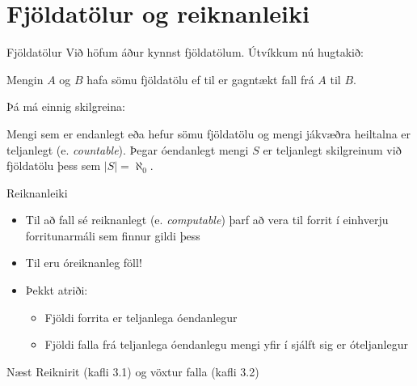 \documentclass[handout]{beamer}
\begin{document}
\section{Fjöldatölur og reiknanleiki}

\begin{frame}{Fjöldatölur}
Við höfum áður kynnst fjöldatölum. Útvíkkum nú hugtakið:

\begin{tcolorbox}[title=Eins fjöldatölur]
Mengin $A$ og $B$ hafa sömu fjöldatölu ef til er gagntækt fall frá $A$ til $B$.
\end{tcolorbox}

Þá má einnig skilgreina:

\begin{tcolorbox}[title=Teljanleiki]
Mengi sem er endanlegt eða hefur sömu fjöldatölu og mengi jákvæðra heiltalna er teljanlegt (e. \emph{countable}). Þegar óendanlegt mengi $S$ er teljanlegt skilgreinum við fjöldatölu þess sem $|S| = \aleph_0$.
\end{tcolorbox}
\end{frame}

\begin{frame}{Reiknanleiki}
\begin{itemize}
 \item Til að fall sé reiknanlegt (e. \emph{computable}) þarf að vera til forrit í einhverju forritunarmáli sem finnur gildi þess
 \item Til eru óreiknanleg föll!
 \item Þekkt atriði:
 \begin{itemize}
  \item Fjöldi forrita er teljanlega óendanlegur
  \item Fjöldi falla frá teljanlega óendanlegu mengi yfir í sjálft sig er óteljanlegur
 \end{itemize}
\end{itemize}
\end{frame}

\begin{frame}{Næst}
Reiknirit (kafli 3.1) og vöxtur falla (kafli 3.2)
\end{frame}
\end{document}
